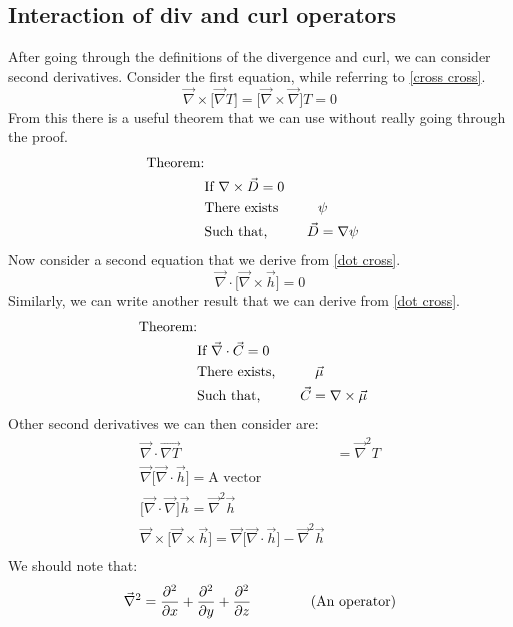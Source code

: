 \subsection{Interaction of div and curl operators}
After going through the definitions of the divergence and curl, we can consider second derivatives. Consider the first equation, while referring to \autoref{cross cross}.
\begin{equation}
\vec{\nabla} \times \Big[ \vec{\nabla} T \Big] = \Big[ \vec{\nabla} \times \vec{\nabla} \Big]T = 0
\end{equation}
From this there is a useful theorem that we can use without really going through the proof. 
\begin{align*}
	\label{curl grad}
	\text{Theorem:}\\
		&\text{If $\nabla \times \vec{D}$} = 0\\
		&\text{There exists} \hspace{10mm}  \psi\\
		&\text{Such that,} \hspace{10mm} \vec{D} = \nabla \psi
\end{align*}
Now consider a second equation that we derive from \autoref{dot cross}. 
\begin{equation}
	\vec{\nabla} \cdot \Big[ \vec{\nabla} \times \vec{h} \Big] = 0
\end{equation}
Similarly, we can write another result that we can derive from \autoref{dot cross}. 
\begin{align*}
	\label{div curl}
	\text{Theorem:}\\
		&\text{If $\vec{\nabla} \cdot \vec{C}  = 0$}\\
		&\text{There exists,} \hspace{10mm} \vec{\mu}\\
		&\text{Such that,} \hspace{10mm} \vec{C} = \nabla \times \vec{\mu}
\end{align*}
Other second derivatives we can then consider are: 
\begin{align}
	\vec{\nabla} \cdot \vec{\nabla T} &= \vec{\nabla}^{2}T\\
	\vec{\nabla} \Big[ \vec{\nabla} \cdot \vec{h} \Big] = \text{A vector}\\
	\Big[ \vec{\nabla} \cdot \vec{\nabla} \Big]\vec{h} = \vec{\nabla}^{2}\vec{h}\\
	\vec{\nabla} \times \Big[ \vec{\nabla} \times \vec{h} \Big] = \vec{\nabla}\Big[ \vec{\nabla} \cdot \vec{h} \Big] - \vec{\nabla}^{2}\vec{h}\\
\end{align} 
We should note that: 
\begin{equation} 
	\vec{\nabla}^{2} = \frac{\partial^{2}}{\partial x} + \frac{\partial^{2}}{\partial y} + \frac{\partial^{2}}{\partial z} \hspace{15mm} \text{(An operator)}
\end{equation}
